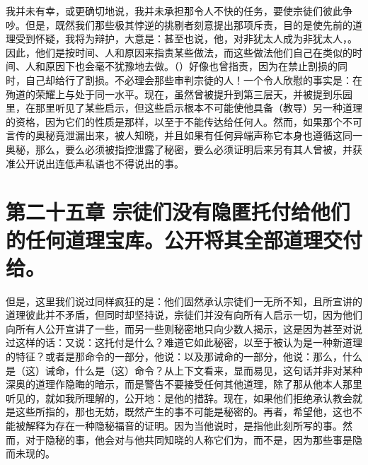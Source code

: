我并未有幸，或更确切地说，我并未承担那令人不快的任务，要使宗徒们彼此争吵。但是，既然我们那些极其悖逆的挑剔者刻意提出那项斥责，目的是使先前的道理受到怀疑，我将为辩护，大意是：甚至也说，他，对非犹太人成为非犹太人，。因此，他们是按时间、人和原因来指责某些做法，而这些做法他们自己在类似的时间、人和原因下也会毫不犹豫地去做。（）好像也曾指责，因为在禁止割损的同时，自己却给行了割损。不必理会那些审判宗徒的人！一个令人欣慰的事实是：在殉道的荣耀上与处于同一水平。现在，虽然曾被提升到第三层天，并被提到乐园里，在那里听见了某些启示，但这些启示根本不可能使他具备（教导）另一种道理的资格，因为它们的性质是那样，以至于不能传达给任何人。然而，如果那个不可言传的奥秘竟泄漏出来，被人知晓，并且如果有任何异端声称它本身也遵循这同一奥秘，那么，要么必须被指控泄露了秘密，要么必须证明后来另有其人曾被，并获准公开说出连低声私语也不得说出的事。\par


\section{第二十五章 宗徒们没有隐匿托付给他们的任何道理宝库。公开将其全部道理交付给。}

但是，这里我们说过同样疯狂的是：他们固然承认宗徒们一无所不知，且所宣讲的道理彼此并不矛盾，但同时却坚持说，宗徒们并没有向所有人启示一切，因为他们向所有人公开宣讲了一些，而另一些则秘密地只向少数人揭示，这是因为甚至对说过这样的话：又说：这托付是什么？难道它如此秘密，以至于被认为是一种新道理的特征？或者是那命令的一部分，他说：以及那诫命的一部分，他说：那么，什么是（这）诫命，什么是（这）命令？从上下文看来，显而易见，这句话并非对某种深奥的道理作隐晦的暗示，而是警告不要接受任何其他道理，除了那从他本人那里听见的，就如我所理解的，公开地：是他的措辞。现在，如果他们拒绝承认教会就是这些所指的，那也无妨，既然产生的事不可能是秘密的。再者，希望他，这也不能被解释为存在一种隐秘福音的证明。因为当他说时，是指他此刻所写的事。然而，对于隐秘的事，他会对与他共同知晓的人称它们为，而不是，因为那些事是隐而未现的。\par

